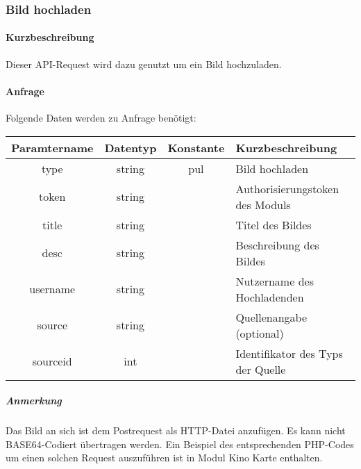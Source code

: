 \subsubsection{Bild hochladen}
\paragraph{Kurzbeschreibung}Dieser API-Request wird dazu genutzt um ein Bild hochzuladen.
\paragraph{Anfrage}Folgende Daten werden zu Anfrage benötigt:
\begin{table}[H]
	\begin{tabular}{|c|c|c|p{6.5cm}|}
		\hline
		\textbf{Paramtername} & \textbf{Datentyp} & \textbf{Konstante} & \textbf{Kurzbeschreibung}                                                                                               \\ \hline
		type                & string            & pul                & Bild hochladen \\ \hline
		token               & string            &                    & Authorisierungstoken des Moduls \\ \hline
		title               & string            &                    & Titel des Bildes \\ \hline
		desc                & string            &                    & Beschreibung des Bildes \\ \hline
		username            & string            &                    & Nutzername des Hochladenden \\ \hline
		source              & string            &                    & Quellenangabe (optional) \\ \hline
		sourceid            & int               &                    & Identifikator des Typs der Quelle \\ \hline
	\end{tabular}
\end{table}
\subparagraph{Anmerkung} Das Bild an sich ist dem Postrequest als HTTP-Datei anzufügen. Es kann nicht BASE64-Codiert übertragen werden. Ein Beispiel des entsprechenden PHP-Codes um einen solchen Request auszuführen ist in Modul {\glqq Kino Karte\grqq} enthalten.
